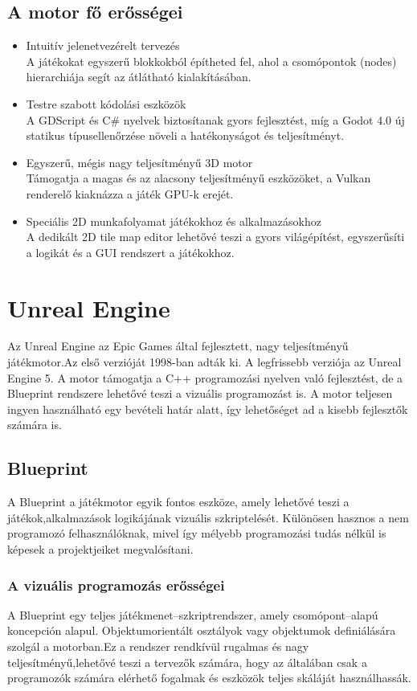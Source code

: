 \documentclass[
]{thesis-ekf}
\theoremstyle{definition}
\theoremstyle{remark}
\begin{document}
\subsection{A motor fő erősségei}
\begin{itemize}
	\item Intuitív jelenetvezérelt tervezés \\ A játékokat egyszerű blokkokból építheted fel, ahol a csomópontok (nodes) hierarchiája segít az átlátható kialakításában.
	\item Testre szabott kódolási eszközök \\ A GDScript és C\# nyelvek biztosítanak gyors fejlesztést, míg a Godot 4.0 új statikus típusellenőrzése növeli a hatékonyságot és teljesítményt.
	\item Egyszerű, mégis nagy teljesítményű 3D motor \\ Támogatja a magas és az alacsony teljesítményű eszközöket, a Vulkan renderelő kiaknázza a játék GPU-k erejét.
	\item Speciális 2D munkafolyamat játékokhoz és alkalmazásokhoz \\ A dedikált 2D tile map editor lehetővé teszi a gyors világépítést, egyszerűsíti a logikát és a GUI rendszert a játékokhoz.
\end{itemize}
\section{Unreal Engine}

Az Unreal Engine az Epic Games által fejlesztett, nagy teljesítményű játékmotor.Az első verzióját 1998-ban adták ki. A legfrissebb verziója az Unreal Engine 5. A motor támogatja a C++ programozási nyelven való fejlesztést, de a Blueprint rendszere lehetővé teszi a vizuális programozást is. A motor teljesen ingyen használható egy bevételi határ alatt, így lehetőséget ad a kisebb fejlesztők számára is.

\subsection{Blueprint}
A Blueprint a játékmotor egyik fontos eszköze, amely lehetővé teszi a játékok,alkalmazások logikájának vizuális szkriptelését. Különösen hasznos a nem programozó felhasználóknak, mivel így mélyebb programozási tudás nélkül is képesek a projektjeiket megvalósítani.
\subsubsection{A vizuális programozás erősségei}
A Blueprint egy teljes játékmenet--szkriptrendszer, amely csomópont--alapú koncepción alapul. Objektumorientált osztályok vagy objektumok definiálására szolgál a motorban.Ez a rendszer rendkívül rugalmas és nagy teljesítményű,lehetővé teszi a tervezők számára, hogy az általában csak a programozók számára elérhető fogalmak és eszközök teljes skáláját használhassák.
\end{document}
